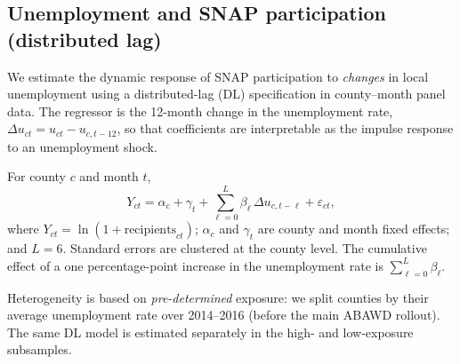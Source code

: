 
\subsection{Unemployment and SNAP participation (distributed lag)}
\label{sec:income-dl}

We estimate the dynamic response of SNAP participation to \emph{changes} in local unemployment using a distributed-lag (DL) specification in county--month panel data. The regressor is the 12-month change in the unemployment rate, $\Delta u_{ct} = u_{ct} - u_{c,t-12}$, so that coefficients are interpretable as the impulse response to an unemployment shock.

For county $c$ and month $t$,
\begin{equation}
Y_{ct} = \alpha_c + \gamma_t + \sum_{\ell=0}^{L} \beta_\ell \, \Delta u_{c,t-\ell} + \varepsilon_{ct},
\end{equation}
where $Y_{ct} = \ln(1 + \text{recipients}_{ct})$; $\alpha_c$ and $\gamma_t$ are county and month fixed effects; and $L=6$. Standard errors are clustered at the county level. The cumulative effect of a one percentage-point increase in the unemployment rate is $\sum_{\ell=0}^{L} \beta_\ell$.

Heterogeneity is based on \emph{pre-determined} exposure: we split counties by their average unemployment rate over 2014--2016 (before the main ABAWD rollout). The same DL model is estimated separately in the high- and low-exposure subsamples.



